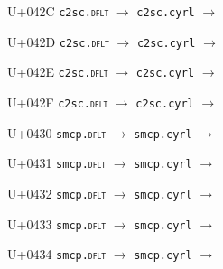 \documentclass{article}
\begin{document}
\begin{substitutions}
\goodbreak

U+042C  \linebreak
    \texttt{c2sc.\textsc{dflt}} $\to$  \linebreak
    \texttt{c2sc.cyrl} $\to$  

\goodbreak

U+042D  \linebreak
    \texttt{c2sc.\textsc{dflt}} $\to$  \linebreak
    \texttt{c2sc.cyrl} $\to$  

\goodbreak

U+042E  \linebreak
    \texttt{c2sc.\textsc{dflt}} $\to$  \linebreak
    \texttt{c2sc.cyrl} $\to$  

\goodbreak

U+042F  \linebreak
    \texttt{c2sc.\textsc{dflt}} $\to$  \linebreak
    \texttt{c2sc.cyrl} $\to$  

\goodbreak

U+0430  \linebreak
    \texttt{smcp.\textsc{dflt}} $\to$  \linebreak
    \texttt{smcp.cyrl} $\to$  

\goodbreak

U+0431  \linebreak
    \texttt{smcp.\textsc{dflt}} $\to$  \linebreak
    \texttt{smcp.cyrl} $\to$  

\goodbreak

U+0432  \linebreak
    \texttt{smcp.\textsc{dflt}} $\to$  \linebreak
    \texttt{smcp.cyrl} $\to$  

\goodbreak

U+0433  \linebreak
    \texttt{smcp.\textsc{dflt}} $\to$  \linebreak
    \texttt{smcp.cyrl} $\to$  

\goodbreak

U+0434  \linebreak
    \texttt{smcp.\textsc{dflt}} $\to$  \linebreak
    \texttt{smcp.cyrl} $\to$  


\end{substitutions}
\end{document}
